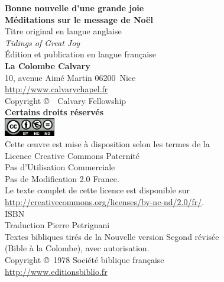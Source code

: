 \newpage
\mbox{}
\vfill

{\scriptsize\liningfont

\textbf{Bonne nouvelle d'une grande joie\\
 Méditations sur le message de No\"el} \\

Titre original en langue anglaise\frcolon{}\\
\emph{Tidings of Great Joy} \\

Édition et publication en langue fran\c{c}aise\frcolon{}\\
 {\bfseries La Colombe Calvary}\\
 10, avenue Aimé Martin \mybullet{} 06200~Nice\\
 \url{http://www.calvarychapel.fr} \\

Copyright \copyright{}~\copyrightdate~Calvary Fellowship \\

\textbf{Certains droits réservés} \\

\includegraphics[width=6em]{by-nc-nd_eu} \\

Cette \oe{}uvre est mise à disposition selon les termes de la \\
 Licence Creative Commons Paternité \\
 \ocadr Pas d'Utilisation Commerciale \\
 \ocadr Pas de Modification 2.0 France. \\

Le texte complet de cette licence est disponible sur \\
 \url{http://creativecommons.org/licenses/by-nc-nd/2.0/fr/}. \\

ISBN~\isbn \\

Traduction\frcolon{} Pierre Petrignani \\

Textes bibliques tirés de la Nouvelle version Segond révisée \\
 (Bible à la Colombe), avec autorisation. \\
 Copyright \copyright{}~1978 Société biblique fran\c{c}aise \\
 \url{http://www.editionsbiblio.fr}

}
\pagebreak

